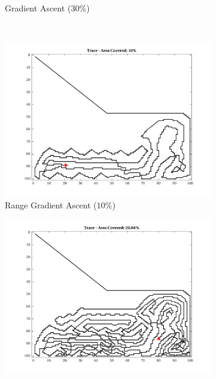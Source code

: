 \begin{figure}[htb!]
\begin{subfigure}[t]{0.32\textwidth}
        \ssp
        \captionsetup{skip=0.20\baselineskip,size=footnotesize}
        \caption{Gradient Ascent ($30\%$)}
    \end{subfigure}%
    \\
    \begin{subfigure}[t]{0.32\textwidth}
        \centering
        \includegraphics[width=\linewidth]{figures/hbresults/path_gr_10p_100x100_sf_1_seed_2.png}
        \ssp
        \captionsetup{skip=0.20\baselineskip,size=footnotesize}
        \caption{Range Gradient Ascent ($10\%$)}
    \end{subfigure}%
    \begin{subfigure}[t]{0.32\textwidth}
        \centering
        \includegraphics[width=\linewidth]{figures/hbresults/path_gr_20p_100x100_sf_1_seed_2.png}

\end{subfigure}
\end{figure}
